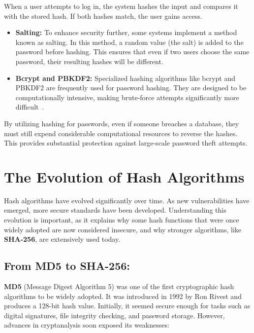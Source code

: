 \documentclass[11pt,a4paper]{article}
\begin{document}
    When a user attempts to log in, the system hashes the input and compares it with the stored hash. If both hashes match, the user gains access.
        \begin{itemize}
            \item \textbf{Salting:} To enhance security further, some systems implement a method known as salting. In this method, a random value (the salt) is added to the password before hashing. This ensures that even if two users choose the same password, their resulting hashes will be different.

            \item \textbf{Bcrypt and PBKDF2:} Specialized hashing algorithms like bcrypt and PBKDF2 are frequently used for password hashing. They are designed to be computationally intensive, making brute-force attempts significantly more difficult~\cite{Bcrypt}\cite{Bcrypt-2}.

        \end{itemize}
        By utilizing hashing for passwords, even if someone breaches a database, they must still expend considerable computational resources to reverse the hashes. This provides substantial protection against large-scale password theft attempts.

\section*{The Evolution of Hash Algorithms}
Hash algorithms have evolved significantly over time. As new vulnerabilities have emerged, more secure standards have been developed. Understanding this evolution is important, as it explains why some hash functions that were once widely adopted are now considered insecure, and why stronger algorithms, like \textbf{SHA-256}, are extensively used today.

    \subsection*{From MD5 to SHA-256:}
    \textbf{MD5} (Message Digest Algorithm 5) was one of the first cryptographic hash algorithms to be widely adopted. It was introduced in 1992 by Ron Rivest and produces a 128-bit hash value. Initially, it seemed secure enough for tasks such as digital signatures, file integrity checking, and password storage. However, advances in cryptanalysis soon exposed its weaknesses:
\end{document}

